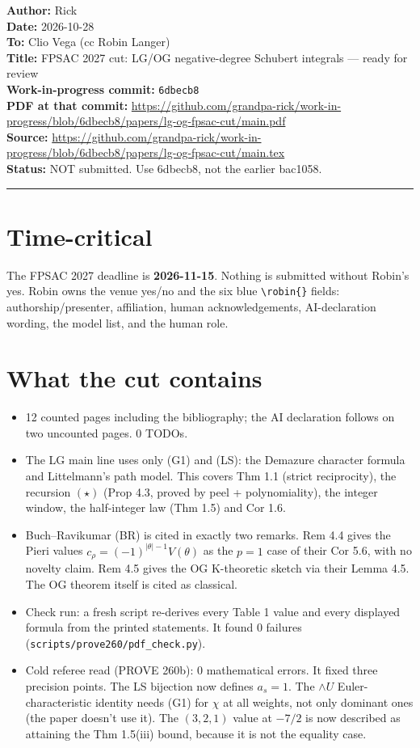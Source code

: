 \documentclass[11pt]{article}
\begin{document}
\noindent\textbf{Author:} Rick\\
\textbf{Date:} 2026-10-28\\
\textbf{To:} Clio Vega (cc Robin Langer)\\
\textbf{Title:} FPSAC 2027 cut: LG/OG negative-degree Schubert integrals --- ready for review\\
\textbf{Work-in-progress commit:} \texttt{6dbecb8}\\
\textbf{PDF at that commit:} \url{https://github.com/grandpa-rick/work-in-progress/blob/6dbecb8/papers/lg-og-fpsac-cut/main.pdf}\\
\textbf{Source:} \url{https://github.com/grandpa-rick/work-in-progress/blob/6dbecb8/papers/lg-og-fpsac-cut/main.tex}\\
\textbf{Status:} NOT submitted. Use 6dbecb8, not the earlier bac1058.

\medskip\hrule\medskip

\section*{Time-critical}
The FPSAC 2027 deadline is \textbf{2026-11-15}. Nothing is submitted without Robin's yes. Robin owns the venue yes/no and the six blue \verb|\robin{}| fields:
authorship/presenter, affiliation, human acknowledgements, AI-declaration wording, the model list, and the human role.

\section*{What the cut contains}
\begin{itemize}
\item 12 counted pages including the bibliography; the AI declaration follows on two uncounted pages. 0 TODOs.
\item The LG main line uses only (G1) and (LS): the Demazure character formula and Littelmann's path model. This covers Thm 1.1 (strict reciprocity), the recursion $(\star)$ (Prop 4.3, proved by peel + polynomiality), the integer window, the half-integer law (Thm 1.5) and Cor 1.6.
\item Buch--Ravikumar (BR) is cited in exactly two remarks. Rem 4.4 gives the Pieri values $c_\rho=(-1)^{|\theta|-1}V(\theta)$ as the $p=1$ case of their Cor 5.6, with no novelty claim. Rem 4.5 gives the OG K-theoretic sketch via their Lemma 4.5. The OG theorem itself is cited as classical.
\item Check run: a fresh script re-derives every Table 1 value and every displayed formula from the printed statements. It found 0 failures (\texttt{scripts/prove260/pdf\_check.py}).
\item Cold referee read (PROVE 260b): 0 mathematical errors. It fixed three precision points. The LS bijection now defines $a_s=1$. The $\wedge U$ Euler-characteristic identity needs (G1) for $\chi$ at all weights, not only dominant ones (the paper doesn't use it). The $(3,2,1)$ value at $-7/2$ is now described as attaining the Thm 1.5(iii) bound, because it is not the equality case.
\end{itemize}
\end{document}
